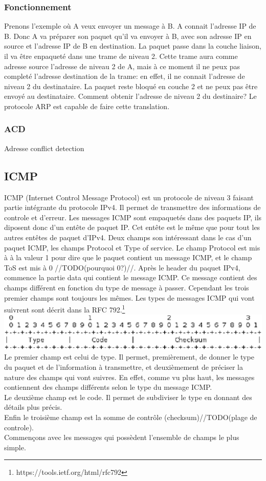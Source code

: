 \documentclass[twoside,openright,a4paper,11pt,french]{article}
\begin{document}
\subsubsection{Fonctionnement}
Prenons l'exemple où A veux envoyer un message à B. A connait l'adresse IP de
B. Donc A va préparer son paquet qu'il va envoyer à B, avec son adresse IP en
source et l'adresse IP de B en destination. La paquet passe dans la couche
liaison, il va être enpaqueté dans une trame de niveau 2. Cette trame aura
comme adresse source l'adresse de niveau 2 de A, mais à ce moment il ne peux
pas completé l'adresse destination de la trame: en effet, il ne connait
l'adresse de niveau 2 du destinataire. La paquet reste bloqué en couche 2 et ne
peux pas être envoyé au destinataire. Comment obtenir l'adresse de niveau 2 du destinaire?
Le protocole ARP est capable de faire cette translation.

\subsubsection{ACD}
Adresse conflict detection
\subsection{ICMP}
ICMP (Internet Control Message Protocol) est un protocole de niveau 3 faisant partie intégrante du protocole IPv4. Il permet de transmettre des informations de controle et d'erreur. Les messages ICMP sont empaquetés dans des paquets IP, ils diposent donc d'un entête de paquet IP. Cet entête est le même que pour tout les autres entêtes de paquet d'IPv4. Deux champs son intéressant dans le cas d'un paquet ICMP, les champs Protocol et Type of service. Le champ Protocol est mis à à la valeur 1 pour dire que le paquet contient un message ICMP, et le champ ToS est mis à 0 //TODO(pourquoi 0?)//.
Après le header du paquet IPv4, commence la partie data qui contient le message ICMP. Ce message contient des champs différent en fonction du type de message à passer. Cependant les trois premier champs sont toujours les mêmes.
Les types de messages ICMP qui vont suivrent sont décrit dans la RFC 792.\footnote{https://tools.ietf.org/html/rfc792}
\\
\includegraphics[width=15cm]{./pics/header.eps}
\\Le premier champ est celui de type. Il permet, premièrement, de donner le type du paquet et de l'information à transmettre, et deuxièmement de préciser la nature des champs qui vont suivres. En effet, comme vu plus haut, les messages contiennent des champs différents selon le type du message ICMP.
\\Le deuxième champ est le code. Il permet de subdiviser le type en donnant des détails plus précis.
\\Enfin le troisième champ est la somme de contrôle (checksum)//TODO(plage de controle).
\\Commençons avec les messages qui possèdent l'ensemble de champs le plus simple.
\end{document}
